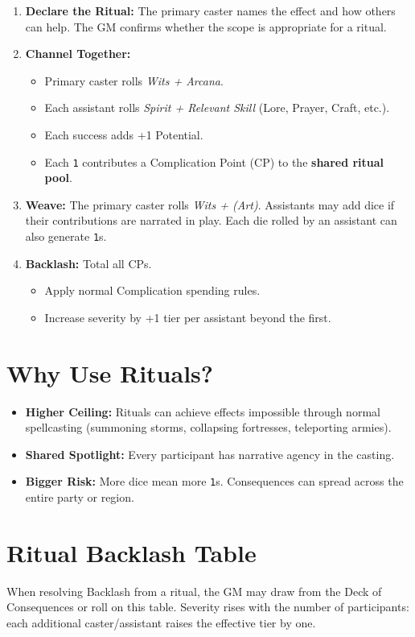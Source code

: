 \documentclass[12pt]{book}
\begin{document}
\begin{enumerate}
  \item \textbf{Declare the Ritual:} The primary caster names the effect and how others can help. The GM confirms whether the scope is appropriate for a ritual. 
  \item \textbf{Channel Together:}
    \begin{itemize}
      \item Primary caster rolls \emph{Wits + Arcana}. 
      \item Each assistant rolls \emph{Spirit + Relevant Skill} (Lore, Prayer, Craft, etc.). 
      \item Each success adds +1 Potential. 
      \item Each \texttt{1} contributes a Complication Point (CP) to the \textbf{shared ritual pool}.
    \end{itemize}
  \item \textbf{Weave:} The primary caster rolls \emph{Wits + (Art)}. Assistants may add dice if their contributions are narrated in play. Each die rolled by an assistant can also generate \texttt{1}s.
  \item \textbf{Backlash:} Total all CPs. 
    \begin{itemize}
      \item Apply normal Complication spending rules. 
      \item Increase severity by +1 tier per assistant beyond the first.
    \end{itemize}
\end{enumerate}

\section*{Why Use Rituals?}
\begin{itemize}
  \item \textbf{Higher Ceiling:} Rituals can achieve effects impossible through normal spellcasting (summoning storms, collapsing fortresses, teleporting armies).
  \item \textbf{Shared Spotlight:} Every participant has narrative agency in the casting. 
  \item \textbf{Bigger Risk:} More dice mean more \texttt{1}s. Consequences can spread across the entire party or region.
\end{itemize}

\section*{Ritual Backlash Table}
When resolving Backlash from a ritual, the GM may draw from the Deck of Consequences or roll on this table.
Severity rises with the number of participants: each additional caster/assistant raises the effective tier by one. 
\end{document}

